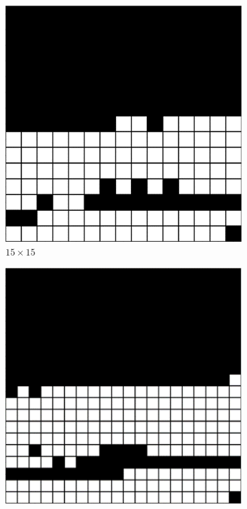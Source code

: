 \begin{figure}[H]
	\centering
	\begin{subfigure}[t]{0.4\textwidth}
		\centering
		\includegraphics[width=\textwidth]{cppn_15x15.png}
		\caption{$15\times 15$}
	\end{subfigure}
	\hfill
	\begin{subfigure}[t]{0.4\textwidth}
		\centering
		\includegraphics[width=\textwidth]{cppn_20x20.png}

\end{subfigure}
\end{figure}
